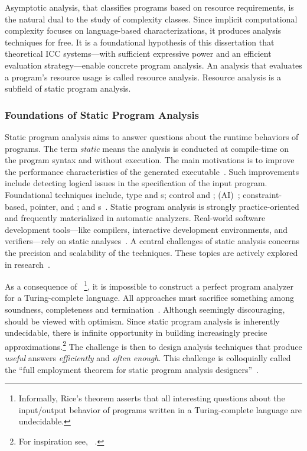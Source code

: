 Asymptotic analysis, that classifies programs based
on resource requirements, is the natural dual to the study of complexity
classes. Since implicit computational complexity focuses on language-based
characterizations, it produces analysis techniques for free. It is a
foundational hypothesis of this dissertation that theoretical ICC systems---with
sufficient expressive power and an efficient evaluation strategy---enable
concrete program analysis. An analysis that evaluates a program's resource usage
is called resource analysis. Resource analysis is a subfield of static program
analysis.

\subsubsection{Foundations of Static Program Analysis}\label{static-analysis-basics}

Static program analysis aims to answer questions about the runtime behaviors of
programs. The term \emph{static} means the analysis is conducted at compile-time
on the program syntax and without execution. The main motivations is to improve
the performance characteristics of the generated
executable~\cite{nielson2010,kennedy2001}. Such improvements include detecting
logical issues in the specification of the input program. Foundational
techniques include, \eg type and s;
control and ;  (AI)~\cite{cousot2021}; constraint-based, pointer, and ;
and s~\cite{nielson2010,moller2023}. Static program
analysis is strongly practice-oriented and frequently materialized in automatic
analyzers. Real-world software development tools---like compilers, interactive
development environments, and verifiers---rely on static
analyses~\cite{livshits2015}. A central challenges of static analysis concerns
the precision and scalability of the techniques. These topics are actively
explored in research~\cite{schiebel2024,dudina2025,arzt2014}.

As a consequence of ~\cite{rice1953}\footnote{Informally,
Rice's theorem asserts that all interesting questions about the input/output
behavior of programs written in a Turing-complete
language are undecidable.}, it is impossible to construct
a perfect program analyzer for a Turing-complete language. All approaches must
sacrifice something among soundness, completeness and
termination~\cite{moller2024}. Although seemingly discouraging,  should be viewed with optimism. Since static program analysis is
inherently undecidable, there is infinite opportunity in
building increasingly precise approximations.\footnote{For inspiration see,
\eg~\textcite{ding2023}.} The challenge is then to design analysis techniques
that produce \emph{useful} answers \emph{efficiently} and \emph{often enough}.
This challenge is colloquially called the \enquote{full employment theorem for
static program analysis designers}~\cite[p. 4]{moller2023}.

